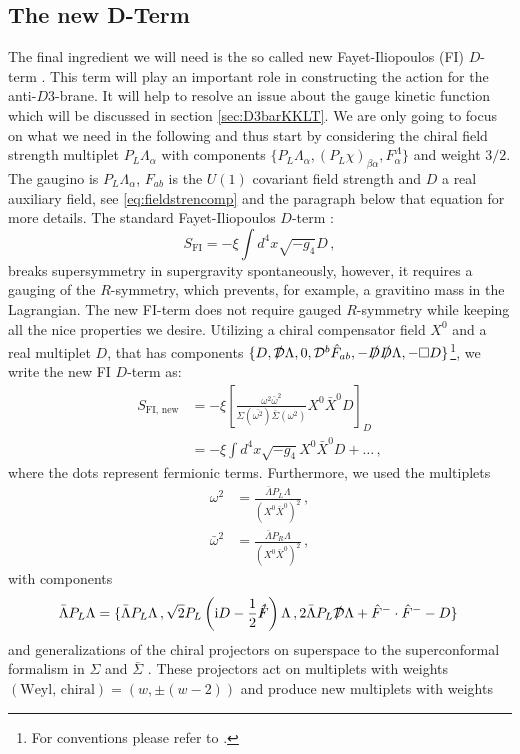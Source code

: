 \documentclass[a4paper,12pt,twoside,openright]{report}
\newcommand{\be}{\begin{equation}}
\newcommand{\ee}{\end{equation}}
\newcommand{\bea}{\begin{equation}\begin{aligned}}
\newcommand{\eea}{\end{aligned}\end{equation}}
\def\rmi{{\rm i}}
\begin{document}
\subsection{The new D-Term}
\label{sec:newD}
The final ingredient we will need is the so called new Fayet-Iliopoulos (FI) $D$-term \cite{Cribiori:2017laj,Cribiori:2018dlc,Cribiori:2018hxv,Kuzenko:2018jlz,Antoniadis:2018cpq}. This term will play an important role in constructing the action for the anti-$D3$-brane. It will help to resolve an issue about the gauge kinetic function which will be discussed in section \ref{sec:D3barKKLT}. We are only going to focus on what we need in the following and thus start by considering the chiral field strength multiplet $P_L \Lambda_\alpha$ with components $\{P_L\Lambda_\alpha,(P_L\chi)_{\beta\alpha},F_\alpha^\Lambda\}$ and weight $3/2$. The gaugino is $P_L \Lambda_\alpha$, $F_{ab}$ is the $U(1)$ covariant field strength and $D$ a real auxiliary field, see \eqref{eq:fieldstrencomp} and the paragraph below that equation for more details. The standard Fayet-Iliopoulos $D$-term \cite{Fayet:1974jb,Freedman:1976uk}:
\be 
S_{\text{FI}}=-\xi \int d^4x \sqrt{-g_4}D\,,
\label{eq:FIDterm}
\ee
breaks supersymmetry in supergravity spontaneously, however, it requires a gauging of the $R$-symmetry, which prevents, for example, a gravitino mass in the Lagrangian. The new FI-term does not require gauged $R$-symmetry while keeping all the nice properties we desire. Utilizing a chiral compensator field $X^0$ and a real multiplet $D$, that has components $\{D,\slashed{\mathcal{D}}\Lambda,0,\mathcal{D}^b \hat{F}_{ab},-\slashed{D}\slashed{D}\Lambda,-\square D\}$\footnote{For conventions please refer to \cite{Freedman:2012zz}.}, we write the new FI $D$-term as:
\bea 
S_{\text{FI, new}} &= - \xi \left[ \frac{\omega^2\bar{\omega}^2}{\Sigma(\bar{\omega^2})\bar{\Sigma}(\omega^2)}X^0\bar{X}^0D\right]_D\\
&= -\xi \int d^4x \sqrt{-g_4}X^0\bar{X}^0 D + \ldots\,,
\eea
where the dots represent fermionic terms. Furthermore, we used the multiplets
\bea 
\omega^2 &= \frac{\bar{\Lambda}P_L \Lambda}{\left(X^0\bar{X}^0\right)^2}\,,\\
\bar{\omega}^2 &= \frac{\bar{\Lambda}P_R\Lambda}{\left(X^0\bar{X}^0\right)^2}\,,
\label{eq:Dnew}
\eea
with components
\be 
\bar{\Lambda}P_L\Lambda = \{\bar{\Lambda}P_L\Lambda\,,\sqrt{2}P_L\left(\rmi D-\frac{1}{2}\slashed{\hat{F}}\right)\Lambda\,,2\bar{\Lambda}P_L\slashed{\mathcal{D}}\Lambda+\hat{F}^-\cdot\hat{F}^--D\}\,
\ee
and generalizations of the chiral projectors on superspace to the superconformal formalism in $\Sigma$ and $\bar{\Sigma}$ \cite{Ferrara:2016een}. These projectors act on multiplets with weights $(\text{Weyl, chiral})=(w,\pm(w-2))$ and produce new multiplets with weights
\end{document}
